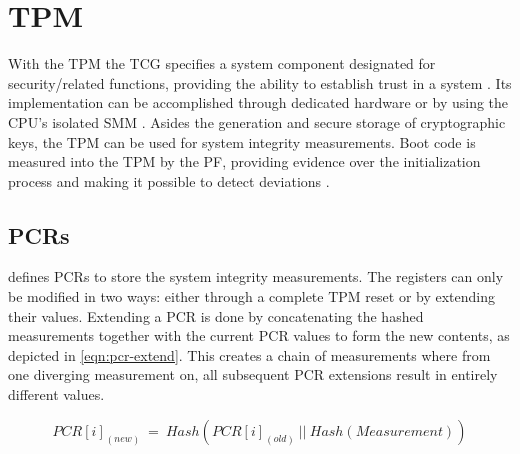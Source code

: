 
\chapter{\acf{TPM}}
\label{sec:tpm}

With the \ac{TPM} the \ac{TCG} specifies a system component designated for security\-/related functions, providing the ability to establish trust in a system \cite{microsoft-windows-trusted-platform-module-overview}.
Its implementation can be accomplished through dedicated hardware or by using the \ac{CPU}'s isolated \ac{SMM} \cite[Section 9.3]{tcg-tpm-library-part1-architecture}.
Asides the generation and secure storage of cryptographic keys, the \ac{TPM} can be used for system integrity measurements.
Boot code is measured into the \ac{TPM} by the \ac{PF}, providing evidence over the initialization process and making it possible to detect deviations \cite{microsoft-windows-trusted-platform-module-overview}.

\section{\acfp{PCR}}
\label{sec:tpm:pcr}

\cite{tcg-tpm-library-part1-architecture} defines \acp{PCR} to store the system integrity measurements.
The registers can only be modified in two ways: either through a complete \ac{TPM} reset or by extending their values.
Extending a \ac{PCR} is done by concatenating the hashed measurements together with the current \ac{PCR} values to form the new contents, as depicted in \autoref{eqn:pcr-extend}.
This creates a chain of measurements where from one diverging measurement on, all subsequent \ac{PCR} extensions result in entirely different values.

\begin{equation}
    PCR[i]_{(new)}\:=\:Hash(PCR[i]_{(old)}\:||\:Hash(Measurement))
    \label{eqn:pcr-extend}
\end{equation}

